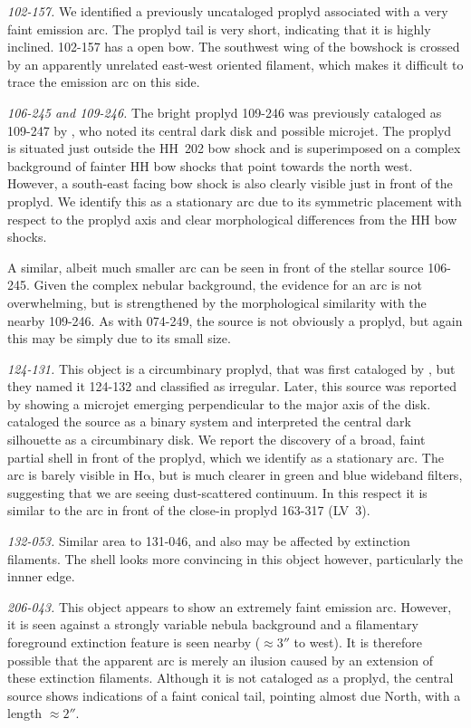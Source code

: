 \documentclass[iop, apj]{emulateapj}
\newcommand\ha{\ensuremath{\mathrm{H\alpha}}}
\begin{document}
\textit{102-157.} We identified a previously uncataloged proplyd associated with a very faint emission arc. The proplyd tail is very short, indicating that it is highly inclined. 102-157 has a open bow. The southwest wing of the bowshock is crossed by an apparently unrelated east-west oriented filament, which makes it difficult to trace the emission arc on this side.


\textit{106-245 and 109-246.} The bright proplyd 109-246
\citep{Ricci:2008a} was previously cataloged as 109-247 by
\citet{Bally:2000a}, who noted its central dark disk and possible
microjet.  The proplyd is situated just outside the HH~202 bow shock
and is superimposed on a complex background of fainter HH bow shocks
that point towards the north west.  However, a
south-east facing bow shock is also clearly visible just in front of
the proplyd.  We identify this as a stationary arc due to its
symmetric placement with respect to the proplyd axis and clear
morphological differences from the HH bow shocks.

A similar, albeit much smaller arc can be seen in front of the stellar
source 106-245.  Given the complex nebular background, the evidence
for an arc is not overwhelming, but is strengthened by the
morphological similarity with the nearby 109-246.  As with 074-249, the
source is not obviously a proplyd, but again this may be simply due to
its small size.  


\textit{124-131.} This object is a circumbinary proplyd, that was
first cataloged by \citet{ODell:1996a}, but they named it 124-132 and
classified as irregular. Later, this source was reported by
\citet{Smith:2005a} showing a microjet emerging perpendicular to the
major axis of the disk. \citet{Ricci:2008a} cataloged the source as a
binary system and \citet{Robberto:2008a} interpreted the central dark
silhouette as a circumbinary disk.  We report the discovery of a
broad, faint partial shell in front of the proplyd, which we identify
as a stationary arc.  The arc is barely visible in \ha{}, but is much
clearer in green and blue wideband filters, suggesting that we are
seeing dust-scattered continuum.  In this respect it is similar to the
arc in front of the close-in proplyd 163-317 (LV~3).   


\textit{132-053.}  Similar area to 131-046, and also may be affected
by extinction filaments.  The shell looks more convincing in this
object however, particularly the innner edge.


\textit{206-043.} This object appears to show an extremely faint
emission arc.  However, it is seen against a strongly variable nebula
background and a filamentary foreground extinction feature is seen
nearby (\(\approx 3''\) to west).  It is therefore possible that
the apparent arc is merely an ilusion caused by an extension of these
extinction filaments.  Although it is not cataloged as a proplyd, the
central source shows indications of a faint conical tail, pointing
almost due North, with a length \(\approx 2''\). 
\end{document}

